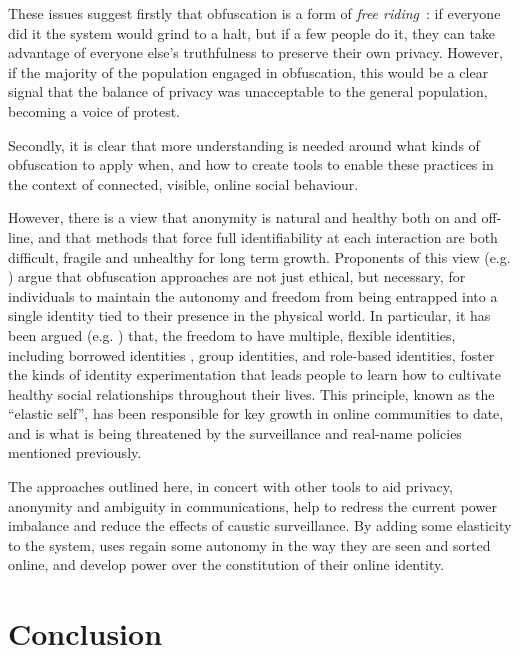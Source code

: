 \documentclass{IOS-Book-Article}     %
\begin{document}
These issues suggest firstly that obfuscation is a form of \emph{free
riding}~\cite{brunton2011vernacular}: if everyone did it the system would grind
to a halt, but if a few people do it, they can take advantage of everyone else's
truthfulness to preserve their own privacy. However, if the majority of the
population engaged in obfuscation, this would be a clear signal that the balance
of privacy was unacceptable to the general population, becoming a voice of
protest.

Secondly, it is clear that more understanding is needed around what kinds of
obfuscation to apply when, and how to create tools to enable these practices in
the context of connected, visible, online social behaviour.

However, there is a view that anonymity is natural and healthy
both on and off-line, and that methods that force full identifiability at each
interaction are both difficult, fragile and unhealthy for long term growth. 
Proponents of this view (e.g. 
\cite{boyd2012Networked,pseudointernet,wang2013talking,turkle2011life}) argue
that obfuscation approaches are not just ethical, but necessary, for individuals
to maintain the autonomy and freedom from being entrapped into a single identity
tied to their presence in the physical world.  In particular, it has been argued
(e.g. \cite{wang2013talking}) that, the freedom to have multiple, flexible
identities, including borrowed identities \cite{dalton2013Pseudonymity}, group
identities, and role-based identities, foster the kinds of identity
experimentation that leads people to learn how to cultivate healthy social
relationships throughout their lives.  This principle, known as the ``elastic
self'', has been responsible for key growth in online communities to date, and
is what is being threatened by the surveillance and real-name policies mentioned
previously. 

The approaches outlined here, in concert with other tools to aid privacy,
anonymity and ambiguity in communications, help to redress the current
power imbalance and reduce the effects of caustic surveillance. By adding some
elasticity to the system, uses regain some autonomy in the way they are seen
and sorted online, and develop power over the constitution of their online
identity.

\section{Conclusion}
\end{document}
